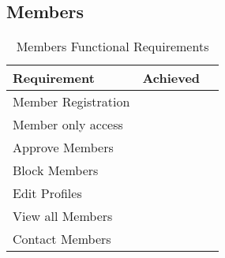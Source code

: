 \subsection{Members}
\begin{table}[H]
\begin{center}
    \begin{tabular}{| l | l | p{1cm} |}
    \hline
    Requirement & Achieved\\ \hline
	Member Registration & \checkmark \\ \hline
	Member only access & \checkmark \\ \hline
	Approve Members & \checkmark \\ \hline
	Block Members & \checkmark \\ \hline
	Edit Profiles & \checkmark \\ \hline
	View all Members & \checkmark \\ \hline
	Contact Members& \checkmark \\ \hline
	\end{tabular}
\end{center}
\caption{Members Functional Requirements}
\end{table}

